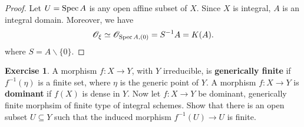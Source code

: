 \documentclass[]{pcmi}
\theoremstyle{plain}
\theoremstyle{definition}
\newtheorem{Exercise}[subsubsection]{Exercise}
\theoremstyle{remark}
\begin{document}
\begin{proof}
    Let $U = \operatorname{Spec} A$ is any open affine subset of $X$. Since $X$ is integral, $A$ is an integral domain. Moreover, we have 
    \[
        \mathscr{O}_\xi \simeq \mathscr{O}_{\operatorname{Spec} A, (0)} = S^{-1}A = K(A). 
    \]
    where $S = A \backslash \{0\}$. 
\end{proof}

\begin{Exercise}
    A morphism $f : X \to Y$, with $Y$ irreducible, is \textbf{generically finite} if $f^{-1}(\eta)$ is a finite set, where $\eta$ is the generic point of $Y$. A morphism $f : X \to Y$ is \textbf{dominant} if $f(X)$ is dense in $Y$. Now let $f : X \to Y$ be dominant, generically finite morphsim of finite type of integral schemes. Show that there is an open subset $U \subseteq Y$ such that the induced morphism $f^{-1}(U) \to U$ is finite. 
\end{Exercise}
\end{document}
